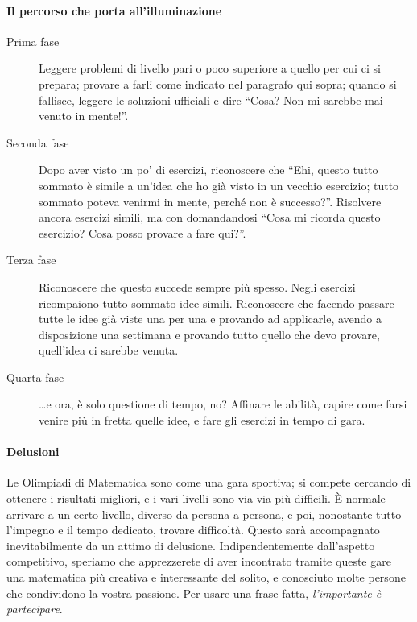 \documentclass[a4paper,10pt]{paper}
\begin{document}
 \paragraph{Il percorso che porta all'illuminazione}
 \begin{description}
  \item[Prima fase] Leggere problemi di livello pari o poco superiore a quello per cui ci si prepara; provare a farli come indicato nel paragrafo qui sopra; quando si fallisce, leggere le soluzioni ufficiali e dire ``Cosa? Non mi sarebbe mai venuto in mente!''.
  \item[Seconda fase] Dopo aver visto un po' di esercizi, riconoscere che ``Ehi, questo tutto sommato è simile a un'idea che ho già visto in un vecchio esercizio; tutto sommato poteva venirmi in mente, perché non è successo?''. Risolvere ancora esercizi simili, ma con domandandosi ``Cosa mi ricorda questo esercizio? Cosa posso provare a fare qui?''.
  \item[Terza fase] Riconoscere che questo succede sempre più spesso. Negli esercizi ricompaiono tutto sommato idee simili. Riconoscere che facendo passare tutte le idee già viste una per una e provando ad applicarle, avendo a disposizione una settimana e provando tutto quello che devo provare, quell'idea ci sarebbe venuta.
  \item[Quarta fase] \dots{}e ora, è solo questione di tempo, no? Affinare le abilità, capire come farsi venire più in fretta quelle idee, e fare gli esercizi in tempo di gara.
 \end{description} 

\paragraph{Delusioni} Le Olimpiadi di Matematica sono come una gara sportiva; si compete cercando di ottenere i risultati migliori, e i vari livelli sono via via più difficili. È normale arrivare a un certo livello, diverso da persona a persona, e poi, nonostante tutto l'impegno e il tempo dedicato, trovare difficoltà. Questo sarà accompagnato inevitabilmente da un attimo di delusione. Indipendentemente dall'aspetto competitivo, speriamo che apprezzerete di aver incontrato tramite queste gare una matematica più creativa e interessante del solito, e conosciuto molte persone che condividono la vostra passione. Per usare una frase fatta, \emph{l'importante è partecipare}.
\end{document}
